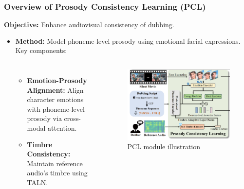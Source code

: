 \begin{frame}
    \frametitle{Overview of Prosody Consistency Learning (PCL)}
    \textbf{Objective:} Enhance audiovisual consistency of dubbing.
    \begin{itemize}
        \item \textbf{Method:} Model phoneme-level prosody using emotional facial expressions. Key components:
        \begin{columns}[c] %
            \begin{itemize}
                \item \textbf{Emotion-Prosody Alignment:} Align character emotions with phoneme-level prosody via cross-modal attention.
                \item \textbf{Timbre Consistency:} Maintain reference audio's timbre using TALN.
            \end{itemize}
            \begin{figure}
                \centering
                \includegraphics[width=\linewidth]{figs/PCL.png}
                \caption{PCL module illustration}
                \label{fig:pcl-diagram}
            \end{figure}
        \end{columns}
    \end{itemize}
\end{frame}


